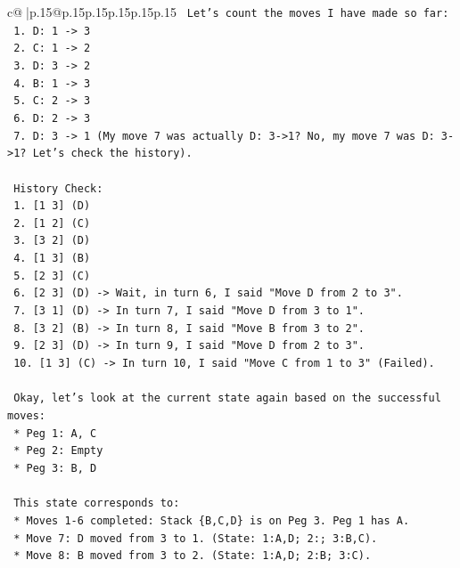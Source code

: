 \documentclass{article}
\begin{document}
{\begin{supertabular}{c@{$\;$}|p{.15\linewidth}@{}p{.15\linewidth}p{.15\linewidth}p{.15\linewidth}p{.15\linewidth}p{.15\linewidth}}
{{{\texttt{    Let's count the moves I have made so far:} \\
\texttt{    1.  D: 1 {-}> 3} \\
\texttt{    2.  C: 1 {-}> 2} \\
\texttt{    3.  D: 3 {-}> 2} \\
\texttt{    4.  B: 1 {-}> 3} \\
\texttt{    5.  C: 2 {-}> 3} \\
\texttt{    6.  D: 2 {-}> 3} \\
\texttt{    7.  D: 3 {-}> 1 (My move 7 was actually D: 3{-}>1? No, my move 7 was D: 3{-}>1? Let's check the history).} \\
\\ 
\texttt{    History Check:} \\
\texttt{    1.  {[}1 3{]} (D)} \\
\texttt{    2.  {[}1 2{]} (C)} \\
\texttt{    3.  {[}3 2{]} (D)} \\
\texttt{    4.  {[}1 3{]} (B)} \\
\texttt{    5.  {[}2 3{]} (C)} \\
\texttt{    6.  {[}2 3{]} (D) {-}> Wait, in turn 6, I said "Move D from 2 to 3".} \\
\texttt{    7.  {[}3 1{]} (D) {-}> In turn 7, I said "Move D from 3 to 1".} \\
\texttt{    8.  {[}3 2{]} (B) {-}> In turn 8, I said "Move B from 3 to 2".} \\
\texttt{    9.  {[}2 3{]} (D) {-}> In turn 9, I said "Move D from 2 to 3".} \\
\texttt{    10. {[}1 3{]} (C) {-}> In turn 10, I said "Move C from 1 to 3" (Failed).} \\
\\ 
\texttt{    Okay, let's look at the current state again based on the successful moves:} \\
\texttt{    *   Peg 1: A, C} \\
\texttt{    *   Peg 2: Empty} \\
\texttt{    *   Peg 3: B, D} \\
\\ 
\texttt{    This state corresponds to:} \\
\texttt{    *   Moves 1{-}6 completed: Stack \{B,C,D\} is on Peg 3. Peg 1 has A.} \\
\texttt{    *   Move 7: D moved from 3 to 1. (State: 1:A,D; 2:; 3:B,C).} \\
\texttt{    *   Move 8: B moved from 3 to 2. (State: 1:A,D; 2:B; 3:C).} \\
}}}
\end{supertabular}}
\end{document}
